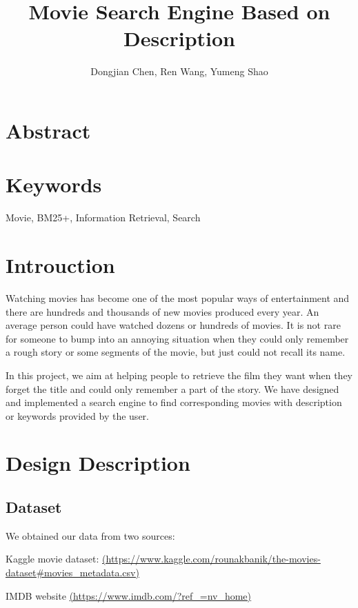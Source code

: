 \documentclass[letterpaper,10pt]{article}
\title{Movie Search Engine Based on Description}
\author{Dongjian Chen, Ren Wang, Yumeng Shao}
\begin{document}
\maketitle

\begin{multicols}{2}
    \section*{Abstract}

    \section*{Keywords}

    Movie, BM25+, Information Retrieval, Search

    \vfill\null
    \columnbreak


    \section{Introuction}

    Watching movies has become one of the most popular ways of entertainment and there are hundreds and thousands of new movies produced every year.
    An average person could have watched dozens or hundreds of movies.
    It is not rare for someone to bump into an annoying situation when they could only remember a rough story or some segments of the movie, but just could not recall its name.

    In this project, we aim at helping people to retrieve the film they want when they forget the title and could only remember a part of the story.
    We have designed and implemented a search engine to find corresponding movies with description or keywords provided by the user.


    \section{Design Description}

    \subsection{Dataset}
    We obtained our data from two sources:

    Kaggle movie dataset:
    \url{(https://www.kaggle.com/rounakbanik/the-movies-dataset#movies_metadata.csv)}

    IMDB website
    \url{(https://www.imdb.com/?ref_=nv_home)}


\end{multicols}
\end{document}
